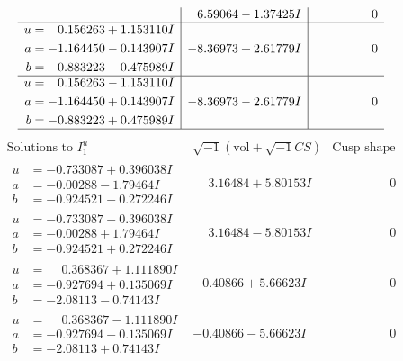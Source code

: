 \documentclass[1p]{elsarticle_modified}
\theoremstyle{definition}
\newcommand{\I}{\sqrt{-1}}
\begin{document}
$$\begin{array}{c|c|c}
 & \phantom{-}6.59064 - 1.37425 I & \phantom{-0.000000 } 0 \\ \hline\begin{aligned}
u &= \phantom{-}0.156263 + 1.153110 I \\
a &= -1.164450 - 0.143907 I \\
b &= -0.883223 - 0.475989 I\end{aligned}
 & -8.36973 + 2.61779 I & \phantom{-0.000000 } 0 \\ \hline\begin{aligned}
u &= \phantom{-}0.156263 - 1.153110 I \\
a &= -1.164450 + 0.143907 I \\
b &= -0.883223 + 0.475989 I\end{aligned}
 & -8.36973 - 2.61779 I & \phantom{-0.000000 } 0\\
 \hline 
 \end{array}$$\newpage$$\begin{array}{c|c|c}  
\text{Solutions to }I^u_{1}& \I (\text{vol} + \sqrt{-1}CS) & \text{Cusp shape}\\
 \hline 
\begin{aligned}
u &= -0.733087 + 0.396038 I \\
a &= -0.00288 - 1.79464 I \\
b &= -0.924521 - 0.272246 I\end{aligned}
 & \phantom{-}3.16484 + 5.80153 I & \phantom{-0.000000 } 0 \\ \hline\begin{aligned}
u &= -0.733087 - 0.396038 I \\
a &= -0.00288 + 1.79464 I \\
b &= -0.924521 + 0.272246 I\end{aligned}
 & \phantom{-}3.16484 - 5.80153 I & \phantom{-0.000000 } 0 \\ \hline\begin{aligned}
u &= \phantom{-}0.368367 + 1.111890 I \\
a &= -0.927694 + 0.135069 I \\
b &= -2.08113 - 0.74143 I\end{aligned}
 & -0.40866 + 5.66623 I & \phantom{-0.000000 } 0 \\ \hline\begin{aligned}
u &= \phantom{-}0.368367 - 1.111890 I \\
a &= -0.927694 - 0.135069 I \\
b &= -2.08113 + 0.74143 I\end{aligned}
 & -0.40866 - 5.66623 I & \phantom{-0.000000 } 0 \\ \hline\begin{aligned}

\end{aligned}
\end{array}$$
\end{document}
